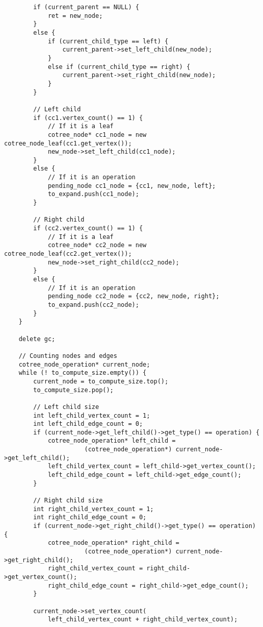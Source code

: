 \begin{lstlisting}
        if (current_parent == NULL) {
            ret = new_node;
        }
        else {
            if (current_child_type == left) {
                current_parent->set_left_child(new_node);
            }
            else if (current_child_type == right) {
                current_parent->set_right_child(new_node);
            }
        }

        // Left child
        if (cc1.vertex_count() == 1) {
            // If it is a leaf
            cotree_node* cc1_node = new cotree_node_leaf(cc1.get_vertex());
            new_node->set_left_child(cc1_node);
        }
        else {
            // If it is an operation
            pending_node cc1_node = {cc1, new_node, left};
            to_expand.push(cc1_node);
        }

        // Right child
        if (cc2.vertex_count() == 1) {
            // If it is a leaf
            cotree_node* cc2_node = new cotree_node_leaf(cc2.get_vertex());
            new_node->set_right_child(cc2_node);
        }
        else {
            // If it is an operation
            pending_node cc2_node = {cc2, new_node, right};
            to_expand.push(cc2_node);
        }
    }

    delete gc;

    // Counting nodes and edges
    cotree_node_operation* current_node;
    while (! to_compute_size.empty()) {
        current_node = to_compute_size.top();
        to_compute_size.pop();

        // Left child size
        int left_child_vertex_count = 1;
        int left_child_edge_count = 0;
        if (current_node->get_left_child()->get_type() == operation) {
            cotree_node_operation* left_child =
                      (cotree_node_operation*) current_node->get_left_child();
            left_child_vertex_count = left_child->get_vertex_count();
            left_child_edge_count = left_child->get_edge_count();
        }

        // Right child size
        int right_child_vertex_count = 1;
        int right_child_edge_count = 0;
        if (current_node->get_right_child()->get_type() == operation) {
            cotree_node_operation* right_child =
                      (cotree_node_operation*) current_node->get_right_child();
            right_child_vertex_count = right_child->get_vertex_count();
            right_child_edge_count = right_child->get_edge_count();
        }

        current_node->set_vertex_count(
            left_child_vertex_count + right_child_vertex_count);


\end{lstlisting}
